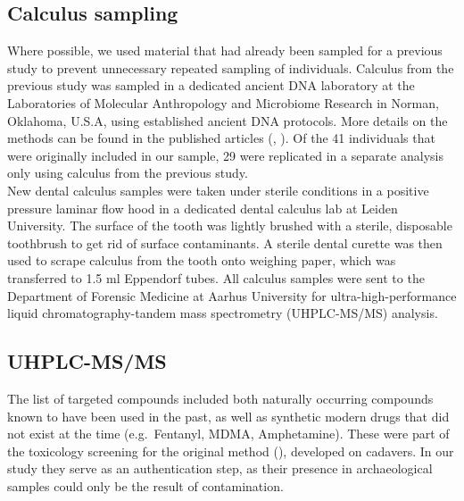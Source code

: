 \documentclass[
  11pt,
  leqno]{scrartcl}
\begin{document}
\subsection{Calculus sampling}\label{calculus-sampling}

Where possible, we used material that had already been sampled for a
previous study to prevent unnecessary repeated sampling of individuals.
Calculus from the previous study was sampled in a dedicated ancient DNA
laboratory at the Laboratories of Molecular Anthropology and Microbiome
Research in Norman, Oklahoma, U.S.A, using established ancient DNA
protocols. More details on the methods can be found in the published
articles (, ). Of the 41
individuals that were originally included in our sample, 29 were
replicated in a separate analysis only using calculus from the previous
study.\\
New dental calculus samples were taken under sterile conditions in a
positive pressure laminar flow hood in a dedicated dental calculus lab
at Leiden University. The surface of the tooth was lightly brushed with
a sterile, disposable toothbrush to get rid of surface contaminants. A
sterile dental curette was then used to scrape calculus from the tooth
onto weighing paper, which was transferred to 1.5 ml Eppendorf tubes.
All calculus samples were sent to the Department of Forensic Medicine at
Aarhus University for ultra-high-performance liquid
chromatography-tandem mass spectrometry (UHPLC-MS/MS) analysis.

\subsection{UHPLC-MS/MS}\label{uhplc-msms}

The list of targeted compounds included both naturally occurring
compounds known to have been used in the past, as well as synthetic
modern drugs that did not exist at the time (e.g.~Fentanyl, MDMA,
Amphetamine). These were part of the toxicology screening for the
original method (), developed on cadavers. In our study they serve as an
authentication step, as their presence in archaeological samples could
only be the result of contamination.
\end{document}
